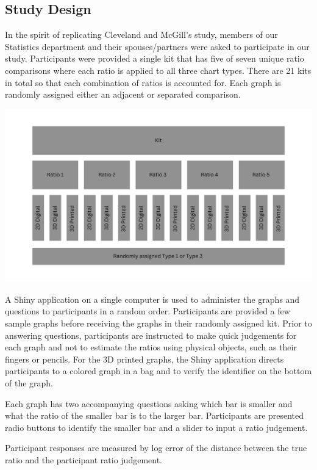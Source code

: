 \documentclass[letterpaper,inpress]{jdsart}
\begin{document}
\hypertarget{study-design}{%
\subsection{Study Design}\label{study-design}}

In the spirit of replicating Cleveland and McGill's study, members of our Statistics department and their spouses/partners were asked to participate in our study.
Participants were provided a single kit that has five of seven unique ratio comparisons where each ratio is applied to all three chart types.
There are 21 kits in total so that each combination of ratios is accounted for.
Each graph is randomly assigned either an adjacent or separated comparison.

\includegraphics{study-design.png}

A Shiny application on a single computer is used to administer the graphs and questions to participants in a random order.
Participants are provided a few sample graphs before receiving the graphs in their randomly assigned kit.
Prior to answering questions, participants are instructed to make quick judgements for each graph and not to estimate the ratios using physical objects, such as their fingers or pencils.
For the 3D printed graphs, the Shiny application directs participants to a colored graph in a bag and to verify the identifier on the bottom of the graph.

Each graph has two accompanying questions asking which bar is smaller and what the ratio of the smaller bar is to the larger bar.
Participants are presented radio buttons to identify the smaller bar and a slider to input a ratio judgement.

Participant responses are measured by log error of the distance between the true ratio and the participant ratio judgement.
\end{document}
